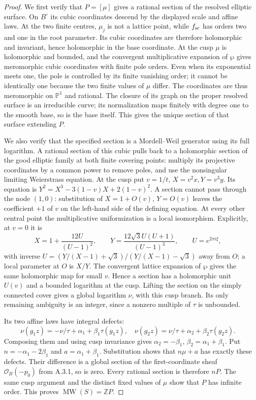 \begin{proof}
We first verify that $P=[\mu]$ gives a rational section of the resolved elliptic surface. On $B^\circ$ its cubic coordinates descend by the displayed scale and affine laws. At the two finite centres, $\mu_j$ is not a lattice point, while $f_{\rm sc}$ has orders two and one in the root parameter. Its cubic coordinates are therefore holomorphic and invariant, hence holomorphic in the base coordinate. At the cusp $\mu$ is holomorphic and bounded, and the convergent multiplicative expansion of $\wp$ gives meromorphic cubic coordinates with finite pole orders. Even when its exponential meets one, the pole is controlled by its finite vanishing order; it cannot be identically one because the two finite values of $\mu$ differ. The coordinates are thus meromorphic on $\mathbb P^1$ and rational. The closure of its graph on the proper resolved surface is an irreducible curve; its normalization maps finitely with degree one to the smooth base, so is the base itself. This gives the unique section of that surface extending $P$.

We also verify that the specified section is a Mordell--Weil generator using its full logarithm. A rational section of this cubic pulls back to a holomorphic section of the good elliptic family at both finite covering points: multiply its projective coordinates by a common power to remove poles, and use the nonsingular limiting Weierstrass equation. At the cusp put $v=1/t$, $X=v^2x,Y=v^3y$. Its equation is $Y^2=X^3-3(1-v)X+2(1-v)^2$. A section cannot pass through the node $(1,0)$: substitution of $X=1+O(v)$, $Y=O(v)$ leaves the coefficient $+1$ of $v$ on the left-hand side of the defining equation. At every other central point the multiplicative uniformization is a local isomorphism. Explicitly, at $v=0$ it is
\[
 X=1+\frac{12U}{(U-1)^2},\qquad
 Y=\frac{12\sqrt3 U(U+1)}{(U-1)^3},\qquad U=e^{2\pi i\xi},
\]
with inverse $U=(Y/(X-1)+\sqrt3)/(Y/(X-1)-\sqrt3)$ away from $O$; a local parameter at $O$ is $X/Y$. The convergent lattice expansion of $\wp$ gives the same holomorphic map for small $v$. Hence a section has a holomorphic unit $U(v)$ and a bounded logarithm at the cusp. Lifting the section on the simply connected cover gives a global logarithm $\nu$, with this cusp branch. Its only remaining ambiguity is an integer, since a nonzero multiple of $\tau$ is unbounded.

Its two affine laws have integral defects:
\[
 \nu(g_1z)=-\nu/\tau+\alpha_1+\beta_1\tau(g_1z),\quad
 \nu(g_2z)=\nu/\tau+\alpha_2+\beta_2\tau(g_2z).
\]
Composing them and using cusp invariance gives $\alpha_2=-\beta_1$, $\beta_2=\alpha_1+\beta_1$. Put $n=-\alpha_1-2\beta_1$ and $a=\alpha_1+\beta_1$. Substitution shows that $n\mu+a$ has exactly these defects. Their difference is a global section of the first-coordinate sheaf $\mathcal O_B(-p_0)$ from A.3.1, so is zero. Every rational section is therefore $nP$. The same cusp argument and the distinct fixed values of $\mu$ show that $P$ has infinite order. This proves $\operatorname{MW}(S)=\mathbb ZP$. \end{proof}

